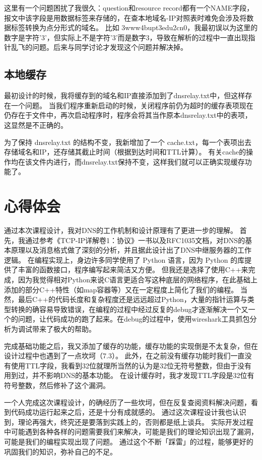 \documentclass[]{article}
\begin{document}
        这里有一个问题困扰了我很久：question和resource record都有一个NAME字段，报文中该字段是用数据标签来存储的，在查本地域名-IP对照表时难免会涉及将数据标签转换为点分形式的域名。
        比如 3www4bupt3edu2cn0，我最初误以为这里的数字是字符'3'，但实际上不是字符'3'而是数字3，导致在解析的过程中一直出现指针乱飞的问题。后来与同学讨论才发现这个问题并解决掉。
    \subsection{本地缓存}
        最初设计的时候，我将缓存到的域名和IP直接添加到了dnsrelay.txt中，但这样存在一个问题。
        当我们程序重新启动的时候，关闭程序前仍为超时的缓存表项现在仍存在于文件中，再次启动程序时，程序会将其当作原本dnsrelay.txt中的表项，这显然是不正确的。

        为了保持 dnsrelay.txt 的结构不变，我新增加了一个 cache.txt，每一个表项出去存储域名和IP，还存储其截止时间（根据到达时间和TTL计算）。
        有关cache的操作均在该文件内进行，而dnsrelay.txt保持不变，这样我们就可以正确实现缓存功能了。

\section{心得体会}
    通过本次课程设计，我对DNS的工作机制和设计原理有了更进一步的理解。
    首先，我通过参考《TCP-IP详解卷1：协议》一书以及RFC1035文档，对DNS的基本原理以及消息格式做了深刻的分析，并且据此设计出了DNS中继服务器的工作逻辑。
    在编程实现上，身边许多同学使用了 Python 语言，因为 Python 的库提供了丰富的函数接口，程序编写起来简洁又方便。
    但我还是选择了使用C++来完成，因为我觉得相对Python来说C语言更适合写这种底层的网络程序，在此基础上添加的部分C++特性（如map容器等）又在一定程度上简化了我们的编程。
    当然，最后C++的代码长度和复杂程度还是远远超过Python，大量的指针运算与类型转换的确容易导致错误，在编程的过程中经过反复的debug才逐渐解决一个又一个的问题，让代码成功的跑了起来。在debug的过程中，使用wireshark工具抓包分析为调试带来了极大的帮助。

    完成基础功能之后，我又添加了缓存的功能，缓存功能的实现倒是不太复杂，但在设计过程中也遇到了一点坎坷（7.3）。
    此外，在之前没有缓存功能时我们一直没有使用TTL字段，我看到32位就理所当然的认为是32位无符号整数，但由于没有用到过，并不影响DNS的基本功能。
    在设计缓存时，我才发现TTL字段是32位有符号整数，然后修补了这个漏洞。

    一个人完成这次课程设计，的确经历了一些坎坷，但在反复查阅资料解决问题，看到代码成功运行起来之后，还是十分有成就感的。
    通过这次课程设计我也认识到，理论再强大，终究还是要落到实践上的，否则都是纸上谈兵。
    实际开发过程中可能遇到各种各样的问题需要我们来解决，可能是我们的理论知识出现了漏洞，可能是我们的编程实现出现了问题。
    通过这个不断「踩雷」的过程，能够更好的巩固我们的知识，弥补自己的不足。
\end{document}
